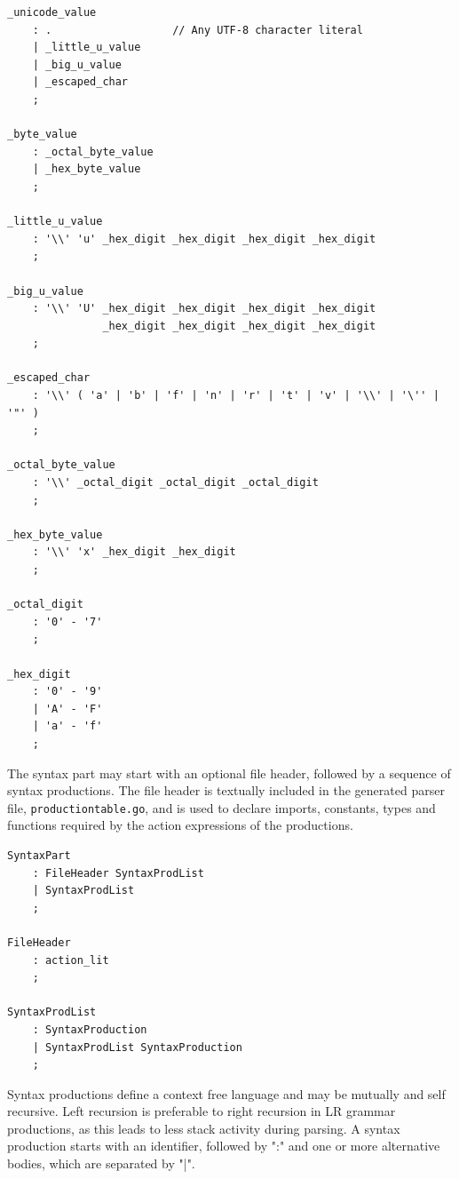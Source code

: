\documentclass[12pt]{article}
\begin{document}
\begin{Verbatim}[frame=single]
_unicode_value 
    : .                   // Any UTF-8 character literal
    | _little_u_value 
    | _big_u_value 
    | _escaped_char 
    ;

_byte_value       
    : _octal_byte_value 
    | _hex_byte_value 
    ;

_little_u_value   
    : '\\' 'u' _hex_digit _hex_digit _hex_digit _hex_digit 
    ;

_big_u_value
    : '\\' 'U' _hex_digit _hex_digit _hex_digit _hex_digit
               _hex_digit _hex_digit _hex_digit _hex_digit 
    ;

_escaped_char
    : '\\' ( 'a' | 'b' | 'f' | 'n' | 'r' | 't' | 'v' | '\\' | '\'' | '"' ) 
    ;

_octal_byte_value 
    : '\\' _octal_digit _octal_digit _octal_digit 
    ;

_hex_byte_value   
    : '\\' 'x' _hex_digit _hex_digit 
    ;

_octal_digit 
    : '0' - '7' 
    ;

_hex_digit 
    : '0' - '9' 
    | 'A' - 'F' 
    | 'a' - 'f'
    ;
\end{Verbatim}

The syntax part may start with an optional file header, followed by a sequence of syntax productions. The file header is textually included in the generated parser file, \verb|productiontable.go|, and is used to declare imports, constants, types and functions required by the action expressions of the productions.

\begin{Verbatim}[frame=single]
SyntaxPart
    : FileHeader SyntaxProdList
    | SyntaxProdList
    ;

FileHeader
    : action_lit
    ;

SyntaxProdList
    : SyntaxProduction
    | SyntaxProdList SyntaxProduction
    ;
\end{Verbatim}

Syntax productions define a context free language and may be mutually and self recursive. Left recursion is preferable to right recursion in LR grammar productions, as this leads to less stack activity during parsing. A syntax production starts with an identifier, followed by ":" and one or more alternative bodies, which are separated by "|".
\end{document}
